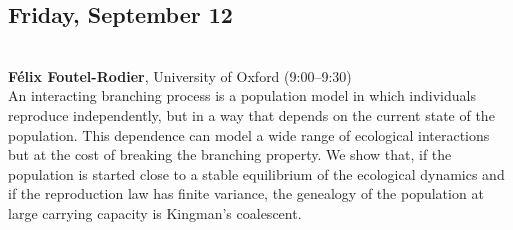 \documentclass[12pt,a4paper]{article}
\begin{document}
\bigskip\bigskip

\subsection*{\sffamily Friday, September 12}
\bigskip\bigskip
{}\\[1ex]{ \large \textbf{ Félix Foutel-Rodier}}, University of Oxford (9:00--9:30) \\[2ex] An interacting branching process is a population model in which individuals reproduce independently, but in a way that depends on the current state of the population. This dependence can model a wide range of ecological interactions but at the cost of breaking the branching property. We show that, if the population is started close to a stable equilibrium of the ecological dynamics and if the reproduction law has finite variance, the genealogy of the population at large carrying capacity is Kingman's coalescent. 
\end{document}
